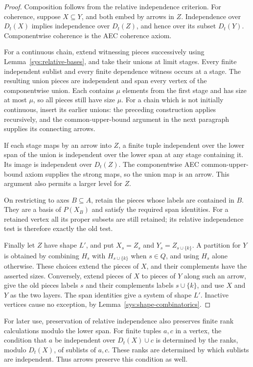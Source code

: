 \begin{proof}
Composition follows from the relative independence criterion.
For coherence, suppose $X\subseteq Y$, and both embed by arrows in
$Z$.  Independence over $D_t(X)$ implies independence over $D_t(Z)$,
and hence over its subset $D_t(Y)$.  Componentwise coherence is the
AEC coherence axiom.

For a continuous chain, extend witnessing pieces successively using
Lemma~\ref{sys:relative-bases}, and take their unions at limit stages.
Every finite independent sublist and every finite dependence witness
occurs at a stage.  The resulting union pieces are independent and
span every vertex of the componentwise union.  Each contains $\mu$
elements from the first stage and has size at most $\mu$, so all
pieces still have size $\mu$.  For a chain which is not initially
continuous, insert its earlier unions: the preceding construction
applies recursively, and the common-upper-bound argument in the next
paragraph supplies its connecting arrows.

If each stage maps by an arrow into $Z$, a finite tuple independent
over the lower span of the union is independent over the lower span
at any stage containing it.  Its image is independent over $D_t(Z)$.
The componentwise AEC common-upper-bound axiom supplies the strong
maps, so the union map is an arrow.  This argument also permits a
larger level for $Z$.

On restricting to axes $B\subseteq A$, retain the pieces whose labels
are contained in $B$.  They are a basis of $P(X_B)$ and satisfy the
required span identities.  For a retained vertex all its proper
subsets are still retained; its relative independence test is
therefore exactly the old test.

Finally let $Z$ have shape $L'$, and put $X_s=Z_s$ and
$Y_s=Z_{s\cup\{k\}}$.  A partition for $Y$ is obtained by combining
$H_s$ with $H_{s\cup\{k\}}$ when $s\in Q$, and using $H_s$ alone
otherwise.  These choices extend the pieces of $X$, and their
complements have the asserted sizes.  Conversely, extend pieces of
$X$ to pieces of $Y$ along such an arrow, give the old pieces labels
$s$ and their complements labels $s\cup\{k\}$, and use $X$ and $Y$
as the two layers.  The span identities give a system of shape $L'$.
Inactive vertices cause no exception, by
Lemma~\ref{sys:shape-combinatorics}.
\end{proof}

For later use, preservation of relative independence also preserves
finite rank calculations modulo the lower span.  For finite tuples
$a,c$ in a vertex, the condition that $a$ be independent over
$D_t(X)\cup c$ is determined by the ranks, modulo $D_t(X)$, of
sublists of $a,c$.  These ranks are determined by which sublists are
independent.  Thus arrows preserve this condition as well.

